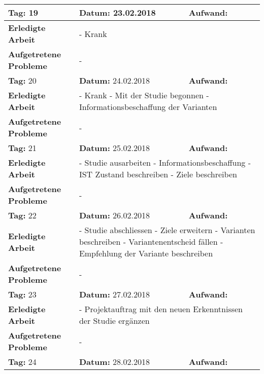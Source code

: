 \begin{longtable}{|p{5cm}|p{5cm}|p{6cm}|}
\rowcolor{heading}\textbf{Tag:} 19 & \textbf{Datum:} 23.02.2018 & \textbf{Aufwand:} \\ \hline
\textbf{Erledigte Arbeit} & \multicolumn{2}{p{11cm}|}{- Krank} \\ \hline
\textbf{Aufgetretene Probleme} & \multicolumn{2}{p{11cm}|}{-} \\ \hline
\rowcolor{heading}\textbf{Tag:} 20 & \textbf{Datum:} 24.02.2018 & \textbf{Aufwand:} \\ \hline
\textbf{Erledigte Arbeit} & \multicolumn{2}{p{11cm}|}{- Krank \newline
- Mit der Studie begonnen \newline
- Informationsbeschaffung der Varianten} \\ \hline
\textbf{Aufgetretene Probleme} & \multicolumn{2}{p{11cm}|}{-} \\ \hline
\rowcolor{heading}\textbf{Tag:} 21 & \textbf{Datum:} 25.02.2018 & \textbf{Aufwand:} \\ \hline
\textbf{Erledigte Arbeit} & \multicolumn{2}{p{11cm}|}{- Studie ausarbeiten \newline
- Informationsbeschaffung \newline
- IST Zustand beschreiben \newline
- Ziele beschreiben} \\ \hline
\textbf{Aufgetretene Probleme} & \multicolumn{2}{p{11cm}|}{-} \\ \hline
\rowcolor{heading}\textbf{Tag:} 22 & \textbf{Datum:} 26.02.2018 & \textbf{Aufwand:} \\ \hline
\textbf{Erledigte Arbeit} & \multicolumn{2}{p{11cm}|}{- Studie abschliessen \newline
- Ziele erweitern \newline
- Varianten beschreiben \newline
- Variantenentscheid fällen \newline
- Empfehlung der Variante beschreiben} \\ \hline
\textbf{Aufgetretene Probleme} & \multicolumn{2}{p{11cm}|}{-} \\ \hline
\rowcolor{heading}\textbf{Tag:} 23 & \textbf{Datum:} 27.02.2018 & \textbf{Aufwand:} \\ \hline
\textbf{Erledigte Arbeit} & \multicolumn{2}{p{11cm}|}{- Projektauftrag mit den neuen Erkenntnissen der Studie ergänzen} \\ \hline
\textbf{Aufgetretene Probleme} & \multicolumn{2}{p{11cm}|}{-} \\ \hline
\rowcolor{heading}\textbf{Tag:} 24 & \textbf{Datum:} 28.02.2018 & \textbf{Aufwand:} \\ \hline

\end{longtable}
